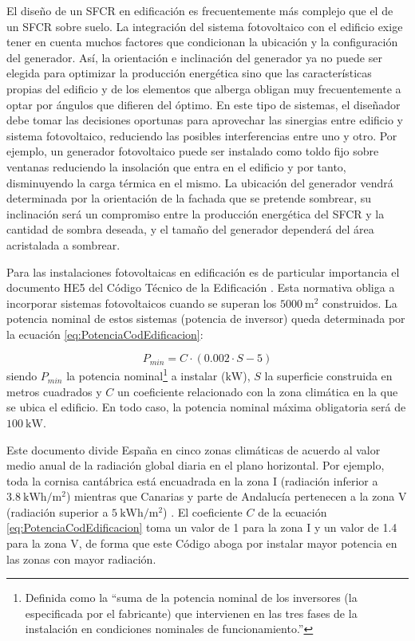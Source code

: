 El diseño de un SFCR en edificación es frecuentemente más complejo
que el de un SFCR sobre suelo. La integración del sistema fotovoltaico
con el edificio exige tener en cuenta muchos factores que condicionan
la ubicación y la configuración del generador. Así, la orientación
e inclinación del generador ya no puede ser elegida para optimizar
la producción energética sino que las características propias del
edificio y de los elementos que alberga obligan muy frecuentemente
a optar por ángulos que difieren del óptimo. En este tipo de sistemas,
el diseñador debe tomar las decisiones oportunas para aprovechar las
sinergias entre edificio y sistema fotovoltaico, reduciendo las posibles
interferencias entre uno y otro. Por ejemplo, un generador fotovoltaico
puede ser instalado como toldo fijo sobre ventanas reduciendo la insolación
que entra en el edificio y por tanto, disminuyendo la carga térmica
en el mismo. La ubicación del generador vendrá determinada por la
orientación de la fachada que se pretende sombrear, su inclinación
será un compromiso entre la producción energética del SFCR y la cantidad
de sombra deseada, y el tamaño del generador dependerá del área acristalada
a sombrear. 

Para las instalaciones fotovoltaicas en edificación es de particular
importancia el documento HE5 del Código Técnico de la
Edificación \cite{CTE2017}.
Esta normativa obliga a incorporar sistemas fotovoltaicos cuando se
superan los $\SI{5000}{\meter\squared}$ construidos. La potencia
nominal de estos sistemas (potencia de inversor) queda determinada por
la ecuación \ref{eq:PotenciaCodEdificacion}:

\begin{equation}
P_{min}=C\cdot(0.002\cdot S - 5)
\label{eq:PotenciaCodEdificacion}
\end{equation}
siendo $P_{min}$ la potencia nominal\footnote{Definida como la ``suma
  de la potencia nominal de los inversores (la especificada por el
  fabricante) que intervienen en las tres fases de la instalación en
  condiciones nominales de funcionamiento.''} a instalar
($\si{\kilo\W}$), $S$ la superficie construida en metros cuadrados y
$C$ un coeficiente relacionado con la zona climática en la que se
ubica el edificio.  En todo caso, la potencia nominal máxima
obligatoria será de $\SI{100}{\kilo\watt}$.

Este documento divide España en cinco zonas climáticas de acuerdo al
valor medio anual de la radiación global diaria en el plano
horizontal.  Por ejemplo, toda la cornisa cantábrica está encuadrada
en la zona I (radiación inferior a $\SI{3.8}{\kWh\per\meter\squared}$)
mientras que Canarias y parte de Andalucía pertenecen a la zona V
(radiación superior a $\SI{5}{\kWh\per\meter\squared}$) . El
coeficiente $C$ de la ecuación \ref{eq:PotenciaCodEdificacion} toma un
valor de 1 para la zona I y un valor de 1.4 para la zona V, de forma
que este Código aboga por instalar mayor potencia en las zonas con
mayor radiación.

